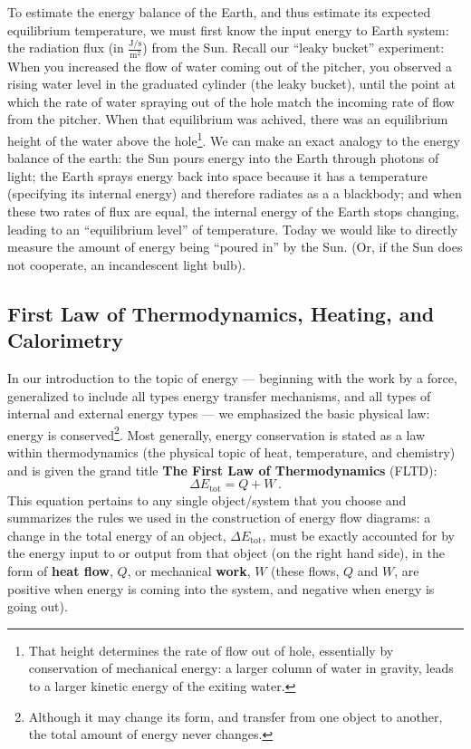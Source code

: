 To estimate the energy balance of the Earth, and thus estimate its expected equilibrium temperature, we must first know the input energy to Earth system: the radiation flux (in $\frac{\text{J}/\text{s}}{\text{m}^2}$) from the Sun.  Recall our ``leaky bucket'' experiment: When you increased the flow of water coming out of the pitcher, you observed a rising water level in the graduated cylinder (the leaky bucket), until the point at which the rate of water spraying out of the hole match the incoming rate of flow from the pitcher.  When that equilibrium was achived, there was an equilibrium height of the water above the hole\footnote{That height determines the rate of flow out of hole, essentially by conservation of mechanical energy: a larger column of water in gravity, leads to a larger kinetic energy of the exiting water.}.  We can make an exact analogy to the energy balance of the earth: the Sun pours energy into the Earth through photons of light; the Earth sprays energy back into space because it has a temperature (specifying its internal energy) and therefore radiates as a a blackbody; and when these two rates of flux are equal, the internal energy of the Earth stops changing, leading to an ``equilibrium level'' of temperature.  Today we would like to directly measure the amount of energy being ``poured in'' by the Sun.  (Or, if the Sun does not cooperate, an incandescent light bulb).

\subsection{First Law of Thermodynamics, Heating, and Calorimetry}

In our introduction to the topic of energy --- beginning with the work by a force, generalized to include all types energy transfer mechanisms, and all types of internal and external energy types --- we emphasized the basic physical law: energy is conserved\footnote{Although it may change its form, and transfer from one object to another, the total amount of energy never changes.}.  Most generally, energy conservation is stated as a law within thermodynamics (the physical topic of heat, temperature, and chemistry) and is given the grand title {\bf The First Law of Thermodynamics} (FLTD):
	\begin{equation*}
	\Delta E_\text{tot}  = Q + W \,.
	\end{equation*}
This equation pertains to any single object/system that you choose and summarizes the rules we used in the construction of energy flow diagrams: a change in the total energy of an object, $\Delta E_\text{tot}$, must be exactly accounted for by the energy input to or output from that object (on the right hand side), in the form of {\bf heat flow}, $Q$, or mechanical {\bf work}, $W$ (these flows, $Q$ and $W$, are positive when energy is coming into the system, and negative when energy is going out).

